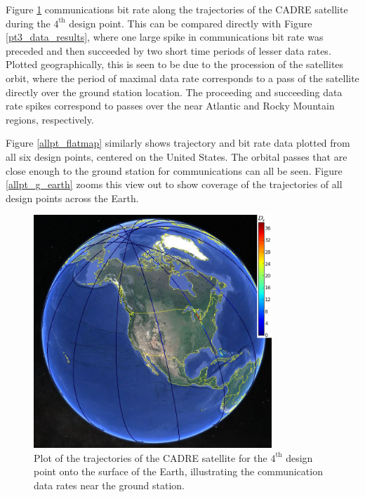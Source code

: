 \documentclass[]{aiaa-tc} %
\begin{document}
Figure \ref{pt3_g_earth} communications bit rate along the trajectories of the
CADRE satellite during the $4^{\textrm{th}}$ design point. This can be compared
directly with Figure \ref{pt3_data_results}, where one large spike in communications
bit rate was preceded and then succeeded by two short time periods of lesser
data rates. Plotted geographically, this is seen to be due to the procession of
the satellites orbit, where the period of maximal data rate corresponds to a
pass of the satellite directly over the ground station location. The proceeding and
succeeding data rate spikes correspond to passes over the near Atlantic and
Rocky Mountain regions, respectively.


Figure \ref{allpt_flatmap} similarly shows trajectory and bit rate data plotted
from all six design points, centered on the United States. The orbital passes
that are close enough to the ground station for communications can all be seen.
Figure \ref{allpt_g_earth} zooms this view out to show coverage of the trajectories
of all design points across the Earth.


\begin{figure}
\centering
\includegraphics[width=0.8\textwidth]{images/pt3_gearth3.png}
\caption[width=0.4\textwidth]{Plot of the trajectories of the CADRE satellite
for the $4^{\textrm{th}}$ design point onto the surface of the Earth, illustrating the
communication data rates near the ground station.}
\label{pt3_g_earth}
\end{figure}
\end{document}
